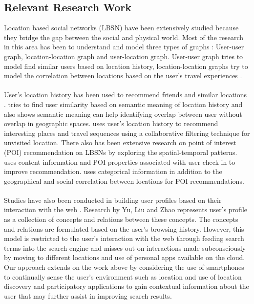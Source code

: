 \documentclass[12pt,letterpaper]{article}
\begin{document}
\subsection{Relevant Research Work}
Location based social networks (LBSN) have been extensively studied because they bridge the gap between the social and physical world. Most of the research in this area has been to understand and model three types of graphs : User-user graph, location-location graph and user-location graph. User-user graph tries to model find similar users based on location history, location-location graphs try to model the correlation between locations based on the user’s travel experiences \cite{lbsn}.
\\\\
User’s location history has been used to recommend friends and similar locations \cite{zheng}. \cite{socialties} tries to find user similarity based on semantic meaning of location history and also shows semantic meaning can help identifying overlap between user without overlap in geographic spaces. \cite{travel} uses user’s location history to recommend interesting places and travel sequences using a collaborative filtering technique for unvisited location. There also has been extensive research on point of interest (POI) recommendation on LBSNs by exploring the spatial-temporal patterns. \cite{gao} uses content information and POI properties associated with user check-in to improve recommendation. \cite{geosoca} uses categorical information in addition to the geographical and social correlation between locations for POI recommendations. 
\\\\
Studies have also been conducted in building user profiles based on their interaction with the web \cite{userprofileweb}. Research by Yu, Liu and Zhao represents user’s profile as a collection of concepts and relations between these concepts. The concepts and relations are formulated based on the user’s browsing history. However, this model is restricted to the user’s interaction with the web through feeding search terms into the search engine and misses out on interactions made subconsciously by moving to different locations and use of personal apps available on the cloud. Our approach extends on the work above by considering the use of smartphones to continually sense the user’s environment such as location and use of location discovery and participatory applications to gain contextual information about the user that may further assist in improving search results. 
\\\\
\end{document}
